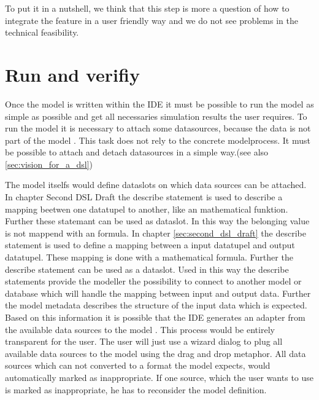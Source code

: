 To put it in a nutshell, we think that this step is more a question of how to integrate the feature in a user friendly way and we do not see problems in the technical feasibility.

\section{Run and verifiy}
Once the model is written within the IDE it must be possible to run the model as simple as possible and get all necessaries simulation results the user requires. To run the model it is necessary to attach some datasources, because the data is not part of the model \autocite{dsl:muetzelfeldt}. This task does not rely to the concrete modelprocess. It must be possible to attach and detach datasources in a simple way.(see also \ref{sec:vision_for_a_dsl})


The model itselfs would define dataslots on which data sources can be attached. In chapter Second DSL Draft the describe statement is used to describe a mapping beetwen one datatupel to another, like an mathematical funktion. Further these statemant can be used as dataslot. In this way the belonging value is not mappend with an formula. In chapter \ref{sec:second_dsl_draft} the describe statement is used to define a mapping between a input datatupel and output datatupel. These mapping is done with a mathematical formula. Further the describe statement can be used as a dataslot. Used in this way the describe statements provide the modeller the possibility to connect to another model or database which will handle the mapping between input and output data. Further the model metadata describes the structure of the input data which is expected. Based on this information it is possible that the IDE generates an adapter from the available data sources to the model \autocite[81]{Villa2009577}. This process would be entirely transparent for the user. The user will just use a wizard dialog to plug all available data sources to the model using the drag and drop metaphor. All data sources which can not converted to a format the model expects, would automatically marked as inappropriate. If one source, which the user wants to use is marked as inappropriate, he has to reconsider the model definition.


